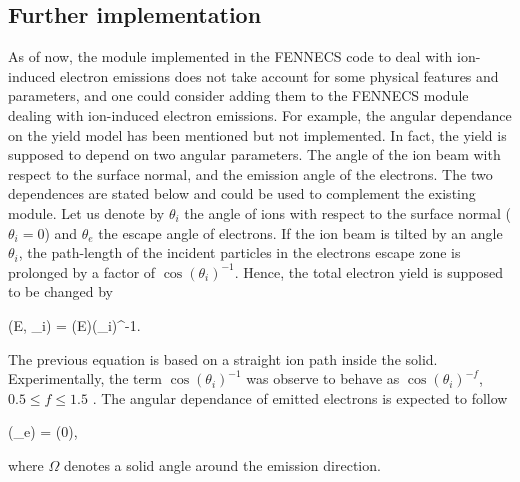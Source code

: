 \newpage
\subsection{Further implementation}

As of now, the module implemented in the FENNECS code to deal with ion-induced electron emissions does not take account for some physical features and parameters, and one could consider adding them to the FENNECS module dealing with ion-induced electron emissions. For example, the angular dependance on the yield model has been mentioned but not implemented. In fact, the yield is supposed to depend on two angular parameters. The angle of the ion beam with respect to the surface normal, and the emission angle of the electrons. The two dependences are stated below and could be used to complement the existing module. Let us denote by $\theta_i$ the angle of ions with respect to the surface normal ($\theta_i = 0$) and $\theta_e$ the escape angle of electrons. If the ion beam is tilted by an angle $\theta_i$, the path-length of the incident particles in the electrons escape zone is prolonged by a factor of $\cos(\theta_i)^{-1}$. Hence, the total electron yield is supposed to be changed by 

\beq
\gamma(E, \theta_i) = \gamma(E)\cdot \cos(\theta_i)^{-1}.
\eeq

\noindent The previous equation is based on a straight ion path inside the solid. Experimentally, the term $\cos(\theta_i)^{-1}$ was observe to behave as $\cos(\theta_i)^{-f}$, $0.5 \leq f \leq 1.5$ \cite{HasselII}. The angular dependance of emitted electrons is expected to follow 

\beq
{}(\theta_e) = (0)\cdot \cos{\theta}, 
\eeq

where $\Omega$ denotes a solid angle around the emission direction.\\



